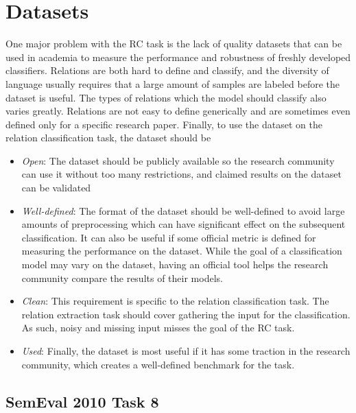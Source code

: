 \section{Datasets}

One major problem with the RC task is the lack of quality datasets that can be used in academia to measure the performance and robustness of freshly developed classifiers. Relations are both hard to define and classify, and the diversity of language usually requires that a large amount of samples are labeled before the dataset is useful. The types of relations which the model should classify also varies greatly. Relations are not easy to define generically and are sometimes even defined only for a specific research paper\cite{culotta_re}\cite{med_re}. Finally, to use the dataset on the relation classification task, the dataset should be

\begin{itemize}

\item \emph{Open}: The dataset should be publicly available so the research community can use it without too many restrictions, and claimed results on the dataset can be validated

\item \emph{Well-defined}: The format of the dataset should be well-defined to avoid large amounts of preprocessing which can have significant effect on the subsequent classification. It can also be useful if some official metric is defined for measuring the performance on the dataset. While the goal of a classification model may vary on the dataset, having an official tool helps the research community compare the results of their models. 

\item \emph{Clean}: This requirement is specific to the relation classification task. The relation extraction task should cover gathering the input for the classification. As such, noisy and missing input misses the goal of the RC task. 

\item \emph{Used}: Finally, the dataset is most useful if it has some traction in the research community, which creates a well-defined benchmark for the task. 

\end{itemize}

\subsection{SemEval 2010 Task 8}

